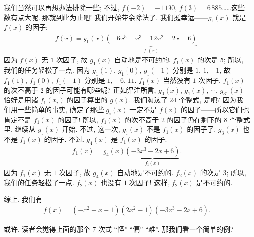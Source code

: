\begin{example}
    我们当然可以再想办法排除一些; 不过, $f(-2) = -1\,190$, $f(3) = 6\,885$……这些数有点大呢. 那就到此为止吧! 我们开始带余除法了. 我们挺幸运——$g_1 (x)$ 就是 $f(x)$ 的因子:
    \begin{align*}
        f(x) = g_1 (x) \underbrace{(-6 x^5-x^3+12 x^2+2 x-6)}_{f_1 (x)}.
    \end{align*}
    因为 $f(x)$ 无 $1$ 次因子, 故 $g_1 (x)$ 自动地是不可约的. $f_1 (x)$ 的次是 $5$; 所以, 我们的任务轻松了一点. 因为 $g_1 (1)$, $g_1 (0)$, $g_1 (-1)$ 分别是 $1$, $1$, $-1$, 故 $f_1 (1)$, $f_1 (0)$, $f_1 (-1)$ 分别是 $1$, $-6$, $11$. $f_1 (x)$ 当然没有 $1$ 次因子. $f_1 (x)$ 的次不高于 $2$ 的因子可能有哪些呢? 正如评注所言, $g_0 (x)$, $g_1 (x)$, $\cdots$, $g_{31} (x)$ 恰好是用诸 $f_1 (x_i)$ 的因子算出的 $g(x)$. 我们淘汰了 $24$ 个整式, 是吧? 因为我们用一些简单的事实, 确定了那些 $g_i (x)$ 一定不是 $f(x)$ 的因子——所以它们也肯定不是 $f_1 (x)$ 的因子! 所以, $f_1 (x)$ 的次不高于 $2$ 的因子仍在剩下的 $8$ 个整式里. 继续从 $g_1 (x)$ 开始. 不过, 这一次, $g_1 (x)$ 不是 $f_1 (x)$ 的因子了. $g_3 (x)$ 也不是 $f_1 (x)$ 的因子. 不过, $g_4 (x)$ 是 $f_1 (x)$ 的因子:
    \begin{align*}
        f_1 (x) = g_4 (x) \underbrace{(-3 x^3-2 x+6)}_{f_2 (x)}.
    \end{align*}
    因为 $f_1 (x)$ 无 $1$ 次因子, 故 $g_4 (x)$ 自动地是不可约的. $f_2 (x)$ 的次是 $3$; 所以, 我们的任务轻松了一点. $f_2 (x)$ 也没有 $1$ 次因子! 这样, $f_2 (x)$ 是不可约的.

    综上, 我们有
    \begin{align*}
        f(x) = (-x^2+x+1) (2x^2-1) (-3x^3-2x+6).
    \end{align*}
\end{example}

或许, 读者会觉得上面的那个 $7$ 次式 ``怪'' ``偏'' ``难''. 那我们看一个简单的例?

